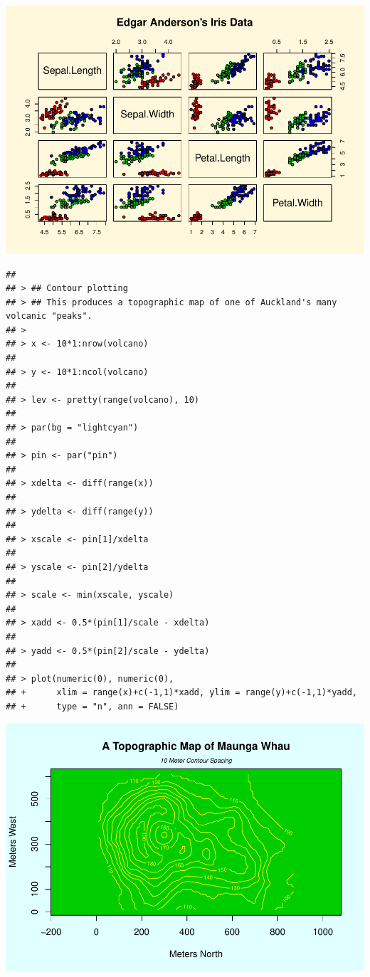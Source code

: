 \documentclass[
]{book}
\begin{document}
\includegraphics{TudodoR_files/figure-latex/unnamed-chunk-147-9.pdf}

\begin{verbatim}
## 
## > ## Contour plotting
## > ## This produces a topographic map of one of Auckland's many volcanic "peaks".
## > 
## > x <- 10*1:nrow(volcano)
## 
## > y <- 10*1:ncol(volcano)
## 
## > lev <- pretty(range(volcano), 10)
## 
## > par(bg = "lightcyan")
## 
## > pin <- par("pin")
## 
## > xdelta <- diff(range(x))
## 
## > ydelta <- diff(range(y))
## 
## > xscale <- pin[1]/xdelta
## 
## > yscale <- pin[2]/ydelta
## 
## > scale <- min(xscale, yscale)
## 
## > xadd <- 0.5*(pin[1]/scale - xdelta)
## 
## > yadd <- 0.5*(pin[2]/scale - ydelta)
## 
## > plot(numeric(0), numeric(0),
## +      xlim = range(x)+c(-1,1)*xadd, ylim = range(y)+c(-1,1)*yadd,
## +      type = "n", ann = FALSE)
\end{verbatim}

\includegraphics{TudodoR_files/figure-latex/unnamed-chunk-147-10.pdf}
\end{document}
